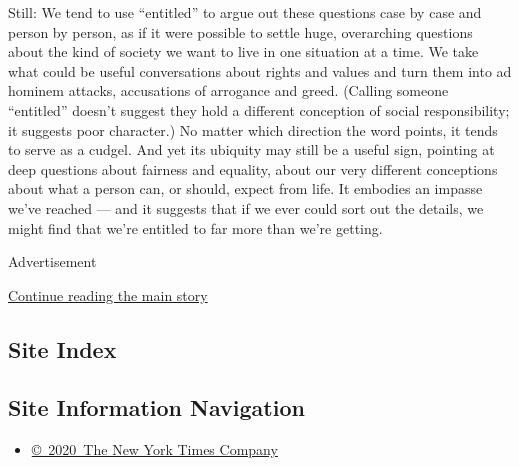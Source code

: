 Still: We tend to use ``entitled'' to argue out these questions case by
case and person by person, as if it were possible to settle huge,
overarching questions about the kind of society we want to live in one
situation at a time. We take what could be useful conversations about
rights and values and turn them into ad hominem attacks, accusations of
arrogance and greed. (Calling someone ``entitled'' doesn't suggest they
hold a different conception of social responsibility; it suggests poor
character.) No matter which direction the word points, it tends to serve
as a cudgel. And yet its ubiquity may still be a useful sign, pointing
at deep questions about fairness and equality, about our very different
conceptions about what a person can, or should, expect from life. It
embodies an impasse we've reached --- and it suggests that if we ever
could sort out the details, we might find that we're entitled to far
more than we're getting.

Advertisement

\protect\hyperlink{after-bottom}{Continue reading the main story}

\hypertarget{site-index}{%
\subsection{Site Index}\label{site-index}}

\hypertarget{site-information-navigation}{%
\subsection{Site Information
Navigation}\label{site-information-navigation}}

\begin{itemize}
\tightlist
\item
  \href{https://help.nytimes3xbfgragh.onion/hc/en-us/articles/115014792127-Copyright-notice}{©~2020~The
  New York Times Company}
\end{itemize}

